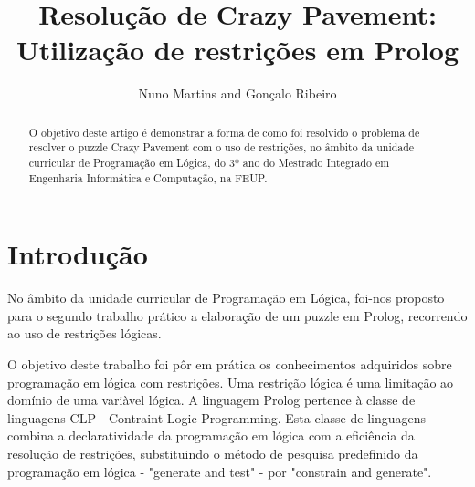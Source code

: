 \documentclass[runningheads,a4paper,12pt]{llncs}
\begin{document}
\mainmatter  %

\title{Resolução de Crazy Pavement:\\Utilização de restrições em Prolog}


%
%
\author{Nuno Martins and Gonçalo Ribeiro}

%
%

\maketitle


\begin{abstract}
O objetivo deste artigo é demonstrar a forma de como foi resolvido o problema de resolver o puzzle Crazy Pavement com o uso de restrições, no âmbito da unidade curricular de Programação em Lógica, do 3º ano do Mestrado Integrado em Engenharia Informática e Computação, na FEUP.
\end{abstract}
\newpage
\section{Introdução}

No âmbito da unidade curricular de Programação em Lógica, foi-nos proposto para o segundo trabalho prático a elaboração de um puzzle em Prolog, recorrendo ao uso de restrições lógicas.

O objetivo deste trabalho foi pôr em prática os conhecimentos adquiridos sobre programação em lógica com restrições. Uma restrição lógica é uma limitação ao domínio de uma variàvel lógica. A linguagem Prolog pertence à classe de linguagens CLP - Contraint Logic Programming. Esta classe de linguagens combina a declaratividade da programação em lógica com a eficiência da resolução de restrições, substituindo o método de pesquisa predefinido da programação em lógica - "generate and test" - por "constrain and generate".
\end{document}
